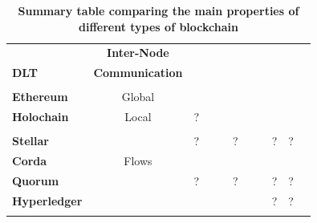 \begin{table}
\begin{centering}
{\begin{tabular}{| l | c | c | c | c | c | c | c | c | c | c |}
\hline
				& \textbf{Inter-Node}		& \textbf{}  			& \textbf{} 	&
				& \textbf{} 				& \textbf{}				&\textbf{}
				& \textbf{} 				& \textbf{}				&\textbf{} \\
\textbf{DLT}		& \textbf{Communication} 	& \textbf{} 				& \textbf{} 		& \textbf{} 
				& \textbf{} 				& \textbf{}				&\textbf{} 
				& \textbf{} 				& \textbf{}				&\textbf{} \\
				& \textbf{} 				& \textbf{} 				& \textbf{} 				&
				& \textbf{} 				& \textbf{ }				&\textbf{} 
				& \textbf{} 				& \textbf{}				&\textbf{} \\
\hline
\hline
\textbf{Ethereum}	&Global			&		&				&	&
				&			&		&	&				& \\
\hline
\textbf{Holochain}	&Local		&?		&	&				&
				&			& 		&				&				& \\
				&			&		&				&				&
				&			& 		&				&				& \\
\hline
\textbf{Stellar}		&			&?		&				&				&?
				&			& 		&?				&?				&\\
\hline
\textbf{Corda} 		&Flows			&		&&				&
				&			&		&			&				&\\
\hline
\textbf{Quorum} 	&			&?		&				&	&?
				&			& 		&?				&?				&\\
\hline
\textbf{Hyperledger}	&			&		&				&	&
				&			& 		&?				&?				& \\
 				&			&		&				&			&
				&			& 		&				&				& \\
\hline
\end{tabular}}


\caption{\bf \small Summary table comparing the main properties of different types of blockchain}
\label{blockchain_type}
\end{centering}
\end{table}





